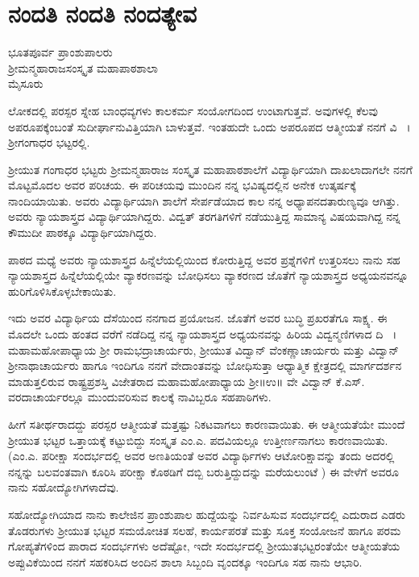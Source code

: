 {\fontsize{14}{16}\selectfont
\chapter{ನಂದತಿ ನಂದತಿ ನಂದತ್ಯೇವ}                           

\begin{center}
\smallskip

ಭೂತಪೂರ್ವ ಪ್ರಾಂಶುಪಾಲರು\\
ಶ್ರೀಮನ್ಮಹಾರಾಜಸಂಸ್ಕೃತ  ಮಹಾಪಾಠಶಾಲಾ\\
ಮೈಸೂರು
\addrule
\end{center}
ಲೋಕದಲ್ಲಿ ಪರಸ್ಪರ ಸ್ನೇಹ ಬಾಂಧವ್ಯಗಳು  ಕಾಲಕರ್ಮ ಸಂಯೋಗದಿಂದ ಉಂಟಾಗುತ್ತವೆ. ಅವುಗಳಲ್ಲಿ ಕೆಲವು ಅಪರೂಪಕ್ಕೆಂಬಂತೆ ಸುದೀರ್ಘಾನುವಿತ್ತಿಯಾಗಿ ಬಾಳುತ್ತವೆ. ಇಂತಹುದೇ ಒಂದು ಅಪರೂಪದ ಆತ್ಮೀಯತೆ ನನಗೆ ವಿ ~। ಶ್ರೀಗಂಗಾಧರ ಭಟ್ಟರಲ್ಲಿ. 

ಶ್ರೀಯುತ ಗಂಗಾಧರ ಭಟ್ಟರು ಶ್ರೀಮನ್ಮಹಾರಾಜ ಸಂಸ್ಕೃತ ಮಹಾಪಾಠ\-ಶಾಲೆಗೆ ವಿದ್ಯಾರ್ಥಿಯಾಗಿ ದಾಖಲಾದಾಗಲೇ ನನಗೆ ಮೊಟ್ಟಮೊದಲ ಅವರ ಪರಿಚಯ. ಈ ಪರಿಚಯವು ಮುಂದಿನ ನನ್ನ ಭವಿಷ್ಯದಲ್ಲಿನ ಅನೇಕ ಉತ್ಕರ್ಷಕ್ಕೆ ನಾಂದಿಯಾಯಿತು.  ಅವರು ವಿದ್ಯಾರ್ಥಿಯಾಗಿ ಶಾಲೆಗೆ ಸೇರ್ಪಡೆಯಾದ ಕಾಲ ನನ್ನ ಅಧ್ಯಾಪನದ\break ತಾರುಣ್ಯವೂ ಆಗಿತ್ತು. ಅವರು ನ್ಯಾಯಶಾಸ್ತ್ರದ ವಿದ್ಯಾರ್ಥಿಯಾಗಿದ್ದರು. ವಿದ್ವತ್ \hbox{ತರಗತಿ}ಗಳಿಗೆ ನಡೆಯುತ್ತಿದ್ದ ಸಾಮಾನ್ಯ ವಿಷಯವಾಗಿದ್ದ ನನ್ನ ಕೌಮುದೀ ಪಾಠಕ್ಕೂ ವಿದ್ಯಾರ್ಥಿಯಾಗಿದ್ದರು.

ಪಾಠದ ಮಧ್ಯೆ ಅವರು ನ್ಯಾಯಶಾಸ್ತ್ರದ ಹಿನ್ನೆಲೆಯಲ್ಲಿಯಿಂದ ಕೋರುತ್ತಿದ್ದ ಅವರ ಪ್ರಶ್ನೆಗಳಿಗೆ ಉತ್ತರಿಸಲು ನಾನು ಸಹ ನ್ಯಾಯಶಾಸ್ತ್ರದ ಹಿನ್ನೆಲೆಯಲ್ಲಿಯೇ ವ್ಯಾಕರಣವನ್ನು ಬೋಧಿಸಲು ವ್ಯಾಕರಣದ ಜೊತೆಗೆ ನ್ಯಾಯಶಾಸ್ತ್ರದ ಅಧ್ಯಯನವನ್ನೂ ಹುರಿ\-ಗೊಳಿಸಿಕೊಳ್ಳಬೇಕಾಯಿತು. 

ಇದು ಅವರ ವಿದ್ಯಾರ್ಥಿಯ ದೆಸೆಯಿಂದ ನನಗಾದ ಪ್ರಯೋಜನ. ಜೊತೆಗೆ ಅವರ ಬುದ್ಧಿ ಪ್ರಖರತೆಗೂ ಸಾಕ್ಷ್ಯ. ಈ ಮೊದಲೇ ಒಂದು ಹಂತದ ವರೆಗೆ ನಡೆದಿದ್ದ ನನ್ನ ನ್ಯಾಯಶಾಸ್ತ್ರದ ಅಧ್ಯಯನವನ್ನು ಹಿರಿಯ ವಿದ್ವನ್ಮಣಿಗಳಾದ ದಿ ~। ಮಹಾ\-ಮಹೋಪಾಧ್ಯಾಯ ಶ್ರೀ ರಾಮಭದ್ರಾಚಾರ್ಯರು, ಶ್ರೀಯುತ ವಿದ್ವಾನ್ ವೆಂಕಣ್ಣಾಚಾರ್ಯರು ಮತ್ತು ವಿದ್ವಾನ್ ಶ್ರೀನಾಥಾಚಾರ್ಯರು ಹಾಗೂ ಇಂದಿಗೂ ನನಗೆ ವೇದಾಂತವನ್ನು ಬೋಧಿಸುತ್ತಾ ಆಧ್ಯಾತ್ಮಿಕ ಕ್ಷೇತ್ರದಲ್ಲಿ ಮಾರ್ಗದರ್ಶನ ಮಾಡುತ್ತಲಿರುವ ರಾಷ್ಟ್ರಪ್ರಶಸ್ತಿ ವಿಜೇತರಾದ ಮಹಾಮಹೋಪಾಧ್ಯಾಯ ಶ್ರೀ॥ಉ॥ ವೇ ವಿದ್ವಾನ್ ಕೆ.ಎಸ್. ವರದಾಚಾರ್ಯರಲ್ಲೂ ಮುಂದುವರಿಸುವ ಕಾಲಕ್ಕೆ ನಾವಿಬ್ಬರೂ ಸಹಪಾಠಿಗಳು.

ಹೀಗೆ ಸತೀರ್ಥರಾದದ್ದು ಪರಸ್ಪರ ಆತ್ಮೀಯತೆ ಮತ್ತಷ್ಟು ನಿಕಟವಾಗಲು ಕಾರಣ\-ವಾಯಿತು. ಈ ಆತ್ಮೀಯತೆಯೇ ಮುಂದೆ ಶ್ರೀಯುತ ಭಟ್ಟರ ಒತ್ತಾಯಕ್ಕೆ ಕಟ್ಟುಬಿದ್ದು ಸಂಸ್ಕೃತ ಎಂ.ಎ. ಪದವಿಯಲ್ಲೂ ಉತ್ತೀರ್ಣನಾಗಲು ಕಾರಣವಾಯಿತು. (ಎಂ.ಎ. ಪರೀಕ್ಷಾ ಸಂದರ್ಭದಲ್ಲಿ ಅವರ ಅಣತಿಯಂತೆ ಅವರ ವಿದ್ಯಾರ್ಥಿಗಳು ಆಟೋರಿಕ್ಷಾವನ್ನು ತಂದು ಅದರಲ್ಲಿ ನನ್ನನ್ನು ಬಲವಂತವಾಗಿ ಕೂರಿಸಿ ಪರೀಕ್ಷಾ ಕೊಠಡಿಗೆ ದಬ್ಬಿ ಬರುತ್ತಿದ್ದುದನ್ನು ಮರೆಯಲುಂಟೆ ) ಈ ವೇಳೆಗೆ ಅವರೂ ನಾನು ಸಹೋದ್ಯೋಗಿಗಳಾದೆವು. 

ಸಹೋದ್ಯೋಗಿಯಾದ ನಾನು ಕಾಲೇಜಿನ ಪ್ರಾಂಶುಪಾಲ ಹುದ್ದೆಯನ್ನು ನಿರ್ವಹಿಸುವ ಸಂದರ್ಭದಲ್ಲಿ ಎದುರಾದ ಎಡರು ತೊಡರುಗಳು ಶ್ರೀಯುತ ಭಟ್ಟರ ಸಮಯೋಚಿತ ಸಲಹೆ, ಕಾರ್ಯಪರತೆ ಮತ್ತು ಸೂಕ್ತ ಸಂಯೋಜನೆ ಹಾಗೂ ಪರಮ \hbox{ಗೋಪ್ಯತೆ}ಗಳಿಂದ ಪಾರಾದ ಸಂದರ್ಭಗಳು ಅದೆಷ್ಟೋ, ಇದೇ ಸಂದರ್ಭದಲ್ಲಿ ಶ್ರೀಯುತ\break ಭಟ್ಟರಂತೆಯೇ ಆತ್ಮೀಯತೆಯ ಅಪ್ಪುವಿಕೆಯಿಂದ ನನಗೆ ಸಹಕರಿಸಿದ ಅಂದಿನ ಶಾಲಾ ಸಿಬ್ಬಂದಿ ವೃಂದಕ್ಕೂ ಇಂದಿಗೂ ಸಹ ನಾನು ಆಭಾರಿ. 

}
